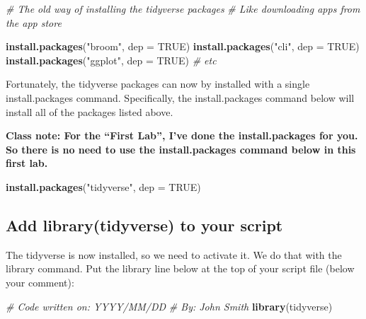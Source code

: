 \documentclass[
]{krantz}
\makeatletter
\newenvironment{Shaded}{\begin{snugshade}}{\end{snugshade}}
\newcommand{\CommentTok}[1]{\textcolor[rgb]{0.37,0.37,0.37}{\textit{#1}}}
\newcommand{\DataTypeTok}[1]{\textcolor[rgb]{0.27,0.27,0.27}{#1}}
\newcommand{\KeywordTok}[1]{\textcolor[rgb]{0.27,0.27,0.27}{\textbf{#1}}}
\newcommand{\NormalTok}[1]{#1}
\newcommand{\OtherTok}[1]{\textcolor[rgb]{0.37,0.37,0.37}{#1}}
\newcommand{\StringTok}[1]{\textcolor[rgb]{0.5,0.5,0.5}{#1}}
\newenvironment{kframe}{%
\medskip{}
\setlength{\fboxsep}{.8em}
 \def\at@end@of@kframe{}%
 \ifinner\ifhmode%
  \def\at@end@of@kframe{\end{minipage}}%
  \begin{minipage}{\columnwidth}%
 \fi\fi%
 \def\FrameCommand##1{\hskip\@totalleftmargin \hskip-\fboxsep
 \colorbox{shadecolor}{##1}\hskip-\fboxsep
     \hskip-\linewidth \hskip-\@totalleftmargin \hskip\columnwidth}%
 \MakeFramed {\advance\hsize-\width
   \@totalleftmargin\z@ \linewidth\hsize
   \@setminipage}}%
 {\par\unskip\endMakeFramed%
 \at@end@of@kframe}
\renewenvironment{Shaded}{\begin{kframe}}{\end{kframe}}
\makeatother
\begin{document}
\begin{Shaded}
\begin{Highlighting}[]
\CommentTok{# The old way of installing the tidyverse packages}
\CommentTok{# Like downloading apps from the app store}

\KeywordTok{install.packages}\NormalTok{(}\StringTok{"broom"}\NormalTok{, }\DataTypeTok{dep =} \OtherTok{TRUE}\NormalTok{)}
\KeywordTok{install.packages}\NormalTok{(}\StringTok{"cli"}\NormalTok{, }\DataTypeTok{dep =} \OtherTok{TRUE}\NormalTok{)}
\KeywordTok{install.packages}\NormalTok{(}\StringTok{"ggplot"}\NormalTok{, }\DataTypeTok{dep =} \OtherTok{TRUE}\NormalTok{)}
\CommentTok{# etc}
\end{Highlighting}
\end{Shaded}

Fortunately, the tidyverse packages can now by installed with a single install.packages command. Specifically, the install.packages command below will install all of the packages listed above.

\textbf{Class note: For the ``First Lab'', I've done the install.packages for you. So there is no need to use the install.packages command below in this first lab.}

\begin{Shaded}
\begin{Highlighting}[]
\KeywordTok{install.packages}\NormalTok{(}\StringTok{"tidyverse"}\NormalTok{, }\DataTypeTok{dep =} \OtherTok{TRUE}\NormalTok{)}
\end{Highlighting}
\end{Shaded}

\hypertarget{add-librarytidyverse-to-your-script}{%
\subsection{Add library(tidyverse) to your script}\label{add-librarytidyverse-to-your-script}}

The tidyverse is now installed, so we need to activate it. We do that with the library command. Put the library line below at the top of your script file (below your comment):

\begin{Shaded}
\begin{Highlighting}[]
\CommentTok{# Code written on: YYYY/MM/DD }
\CommentTok{# By: John Smith}
\KeywordTok{library}\NormalTok{(tidyverse)}
\end{Highlighting}
\end{Shaded}
\end{document}
